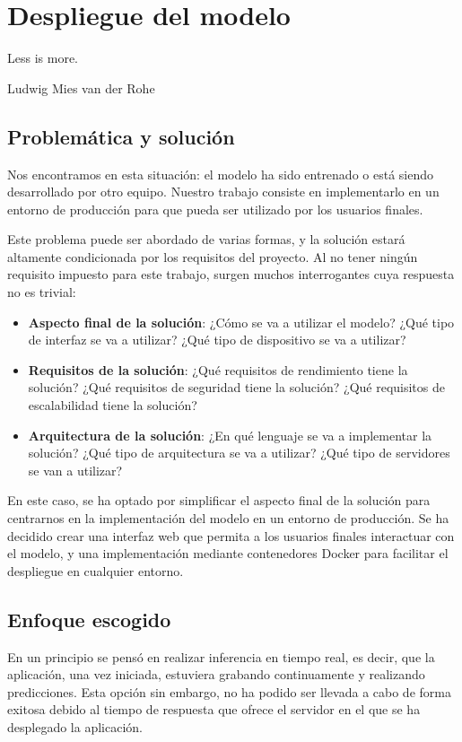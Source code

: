 \chapter{Despliegue del modelo}\label{chp-03}
\epigraph{Less is more.}{Ludwig Mies van der Rohe}

\section{Problemática y solución}

Nos encontramos en esta situación: el modelo ha sido entrenado o está siendo desarrollado por otro equipo.
Nuestro trabajo consiste en implementarlo en un entorno de producción para que pueda ser utilizado por los usuarios finales.

Este problema puede ser abordado de varias formas, y la solución estará altamente condicionada por los requisitos del proyecto.
Al no tener ningún requisito impuesto para este trabajo, surgen muchos interrogantes cuya respuesta no es trivial:

\begin{itemize}
    \item \textbf{Aspecto final de la solución}: ¿Cómo se va a utilizar el modelo? ¿Qué tipo de interfaz se va a utilizar? ¿Qué tipo de dispositivo se va a utilizar?
    \item \textbf{Requisitos de la solución}: ¿Qué requisitos de rendimiento tiene la solución? ¿Qué requisitos de seguridad tiene la solución? ¿Qué requisitos de escalabilidad tiene la solución?
    \item \textbf{Arquitectura de la solución}: ¿En qué lenguaje se va a implementar la solución? ¿Qué tipo de arquitectura se va a utilizar? ¿Qué tipo de servidores se van a utilizar?
    
\end{itemize}

En este caso, se ha optado por simplificar el aspecto final de la solución para centrarnos en la implementación del modelo en un entorno de producción.
Se ha decidido crear una interfaz web que permita a los usuarios finales interactuar con el modelo, y una implementación mediante contenedores Docker para facilitar el despliegue en cualquier entorno.

\section{Enfoque escogido}
En un principio se pensó en realizar inferencia en tiempo real, es decir, que la aplicación, una vez iniciada, estuviera grabando continuamente y realizando predicciones.
Esta opción sin embargo, no ha podido ser llevada a cabo de forma exitosa debido al tiempo de respuesta que ofrece el servidor en el que se ha desplegado la aplicación.

